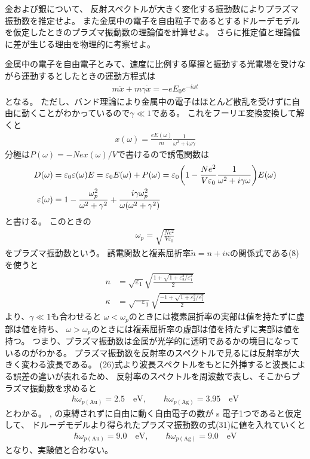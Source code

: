 \documentclass[11pt,dvipdfmx,a4paper]{jsarticle}
\begin{document}
\begin{tcolorbox}[title = 課題2]
    金および銀について、
    反射スペクトルが大きく変化する振動数によりプラズマ振動数を推定せよ。
    また金属中の電子を自由粒子であるとするドルーデモデルを仮定したときのプラズマ振動数の理論値を計算せよ。
    さらに推定値と理論値に差が生じる理由を物理的に考察せよ。
\end{tcolorbox}
金属中の電子を自由電子とみて、速度に比例する摩擦と振動する光電場を受けながら運動するとしたときの運動方程式は
\begin{align}
    m \ddot{x} + m\gamma \dot{x} = -eE_0 e^{-i\omega t}
\end{align}
となる。
ただし、バンド理論により金属中の電子はほとんど散乱を受けずに自由に動くことがわかっているので\(\gamma\ll 1\)である。
これをフーリエ変換変換して解くと
\begin{align}
    x(\omega) = \frac{eE(\omega)}{m}\frac{1}{\omega^2 + i\omega \gamma}
\end{align}
分極は\(P(\omega) = -Nex(\omega)/V\)で書けるので誘電関数は
\begin{align}
    D(\omega) &= \varepsilon_0 \varepsilon(\omega) E
    = \varepsilon_0 E(\omega) + P(\omega)
    = \varepsilon_0 \qty(1 - \frac{Ne^2}{V\varepsilon_0}\frac{1}{\omega^2 + i\gamma\omega})E(\omega)\\
    \varepsilon(\omega) &= 1-\frac{\omega_p^2}{\omega^2 + \gamma^2}+\frac{i\gamma\omega_p^2}{\omega(\omega^2+\gamma^2)}
\end{align}
と書ける。
このときの
\begin{align}
    \omega_p = \sqrt{\frac{Ne^2}{V\varepsilon_0}}
\end{align}
をプラズマ振動数という。
誘電関数と複素屈折率\(\tilde{n}=n+i\kappa\)の関係式である(8)を使うと
\begin{align}
    n &= \sqrt{\varepsilon_1}\sqrt{\frac{1+\sqrt{1+\varepsilon_2^2/\varepsilon_1^2}}{2}} \\
    \kappa &= \sqrt{-\varepsilon_1}\sqrt{\frac{-1+\sqrt{1+\varepsilon_2^2/\varepsilon_1^2}}{2}}
\end{align}
より、\(\gamma\ll 1\)も合わせると
\(\omega<\omega_p\)のときには複素屈折率の実部は値を持たずに虚部は値を持ち、
\(\omega>\omega_p\)のときには複素屈折率の虚部は値を持たずに実部は値を持つ。
つまり、プラズマ振動数は金属が光学的に透明であるかの境目になっているのがわかる。
プラズマ振動数を反射率のスペクトルで見るには反射率が大きく変わる波長である。
(26)式より波長スペクトルをもとに外挿すると波長による誤差の違いが表れるため、
反射率のスペクトルを周波数で表し、そこからプラズマ振動数を求めると
\begin{align*}
    \hbar\omega_{p(\text{Au})} = 2.5 \quad\text{eV},\qquad \hbar\omega_{p(\text{Ag})} = 3.95 \quad\text{eV}
\end{align*}
とわかる。
,  の束縛されずに自由に動く自由電子の数が s 電子1つであると仮定して、
ドルーデモデルより得られたプラズマ振動数の式(31)に値を入れていくと
\begin{align*}
    \hbar\omega_{p(\text{Au})} = 9.0 \quad\text{eV},\qquad \hbar\omega_{p(\text{Ag})} = 9.0 \quad\text{eV}
\end{align*}
となり、実験値と合わない。
\end{document}
